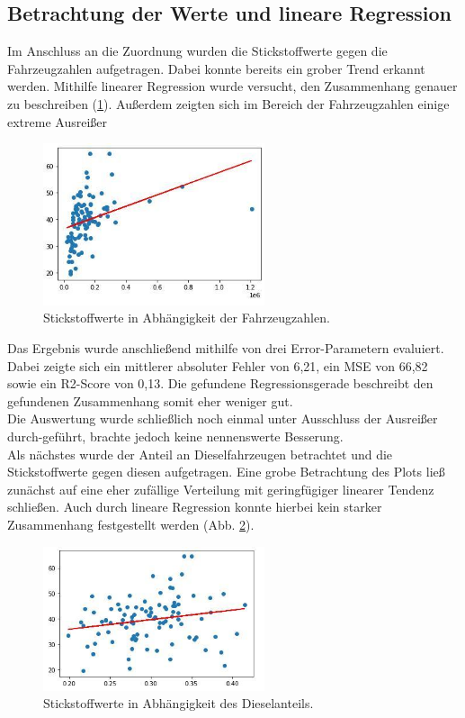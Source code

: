 \documentclass[11pt,a4paper,oneside,german]{article}
\begin{document}
	\subsection{Betrachtung der Werte und lineare Regression}
	
	Im Anschluss an die Zuordnung wurden die Stickstoffwerte gegen die Fahrzeugzahlen aufgetragen. Dabei konnte bereits ein grober Trend erkannt werden. Mithilfe linearer Regression wurde versucht, den Zusammenhang genauer zu beschreiben (\ref{fig:linreginsgesamt}). Außerdem zeigten sich im Bereich der Fahrzeugzahlen einige extreme Ausreißer
	
	\begin{figure}[h!]
		\centering
		\includegraphics[width=6.5cm]{linreginsgesamt.jpg}
		\caption{Stickstoffwerte in Abhängigkeit der Fahrzeugzahlen.}
		\label{fig:linreginsgesamt}
	\end{figure}
	
	Das Ergebnis wurde anschließend mithilfe von drei Error-Parametern evaluiert. Dabei zeigte sich ein mittlerer absoluter Fehler von 6,21, ein MSE von 66,82 sowie ein R2-Score von 0,13. Die gefundene Regressionsgerade beschreibt den gefundenen Zusammenhang somit eher weniger gut. \\
	Die Auswertung wurde schließlich noch einmal unter Ausschluss der Ausreißer durch-geführt, brachte jedoch keine nennenswerte Besserung. \\
	Als nächstes wurde der Anteil an Dieselfahrzeugen betrachtet und die Stickstoffwerte gegen diesen aufgetragen. Eine grobe Betrachtung des Plots ließ zunächst auf eine eher zufällige Verteilung mit geringfügiger linearer Tendenz schließen. Auch durch lineare Regression konnte hierbei kein starker Zusammenhang festgestellt werden (Abb. \ref{fig:linregdieselanteil}).
	
	\begin{figure}[H]
		\centering
		\includegraphics[width=6.5cm]{linregdieselanteil.jpg}
		\caption{Stickstoffwerte in Abhängigkeit des Dieselanteils.}
		\label{fig:linregdieselanteil}
	\end{figure}
	
\end{document}

